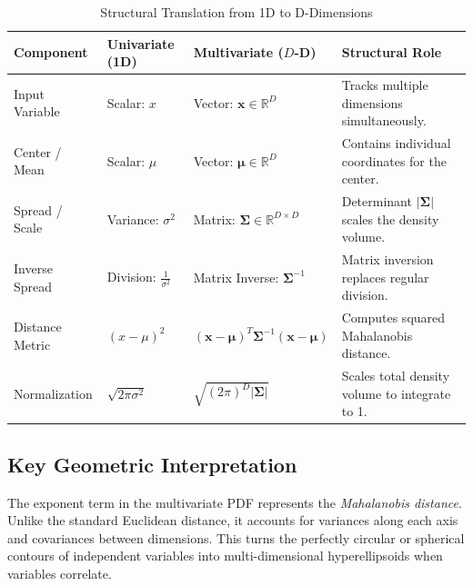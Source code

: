 \documentclass[a4paper,11pt]{article}
\begin{document}
\begin{table}[h!]
\centering
\small
\caption{Structural Translation from 1D to D-Dimensions}
\label{tab:gaussian_comparison}
\begin{tabularx}{\textwidth}{p{2.6cm} p{2.4cm} p{3.2cm} X}
\hline
\textbf{Component} & \textbf{Univariate (1D)} & \textbf{Multivariate ($D$-D)} & \textbf{Structural Role} \\ \hline
Input Variable & Scalar: $x$ & Vector: $\mathbf{x} \in \mathbb{R}^D$ & Tracks multiple dimensions simultaneously. \\ \hline
Center / Mean & Scalar: $\mu$ & Vector: $\boldsymbol{\mu} \in \mathbb{R}^D$ & Contains individual coordinates for the center. \\ \hline
Spread / Scale & Variance: $\sigma^2$ & Matrix: $\boldsymbol{\Sigma} \in \mathbb{R}^{D \times D}$ & Determinant $|\boldsymbol{\Sigma}|$ scales the density volume. \\ \hline
Inverse Spread & Division: $\frac{1}{\sigma^2}$ & Matrix Inverse: $\boldsymbol{\Sigma}^{-1}$ & Matrix inversion replaces regular division. \\ \hline
Distance Metric & $(x - \mu)^2$ & $(\mathbf{x} - \boldsymbol{\mu})^T \boldsymbol{\Sigma}^{-1} (\mathbf{x} - \boldsymbol{\mu})$ & Computes squared Mahalanobis distance. \\ \hline
Normalization & $\sqrt{2\pi\sigma^2}$ & $\sqrt{(2\pi)^D |\boldsymbol{\Sigma}|}$ & Scales total density volume to integrate to 1. \\ \hline
\end{tabularx}
\end{table}

\subsection{Key Geometric Interpretation}
The exponent term in the multivariate PDF represents the \textit{Mahalanobis distance}. Unlike the standard Euclidean distance, it accounts for variances along each axis and covariances between dimensions. This turns the perfectly circular or spherical contours of independent variables into multi-dimensional hyperellipsoids when variables correlate.
\end{document}
